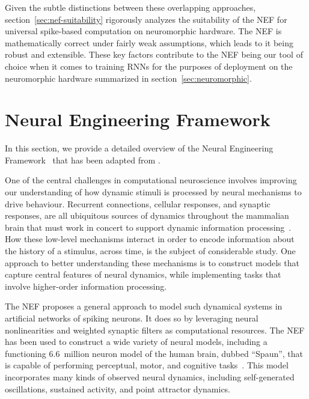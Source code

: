Given the subtle distinctions between these overlapping approaches,
section~\ref{sec:nef-suitability} rigorously analyzes the suitability of the NEF for universal spike-based computation on neuromorphic hardware.
The NEF is mathematically correct under fairly weak assumptions, which leads to it being robust and extensible.
These key factors contribute to the NEF being our tool of choice when it comes to training RNNs for the purposes of deployment on the neuromorphic hardware summarized in section~\ref{sec:neuromorphic}.

\section{Neural Engineering Framework}
\label{sec:nef}

In this section, we provide a detailed overview of the Neural Engineering Framework~\citep[NEF;][]{eliasmith2003a} that has been adapted from \citet{voelker2018}.

One of the central challenges in computational neuroscience involves improving our understanding of how dynamic stimuli is processed by neural mechanisms to drive behaviour.
Recurrent connections, cellular responses, and synaptic responses, are all ubiquitous sources of dynamics throughout the mammalian brain that must work in concert to support dynamic information processing~\citep{kandel2000principles}.
How these low-level mechanisms interact in order to encode information about the history of a stimulus, across time, is the subject of considerable study.
One approach to better understanding these mechanisms is to construct models that capture central features of neural dynamics, while implementing tasks that involve higher-order information processing.


The NEF proposes a general approach to model such dynamical systems in artificial networks of spiking neurons.
It does so by leveraging neural nonlinearities and weighted synaptic filters as computational resources.
The NEF has been used to construct a wide variety of neural models, including a functioning 6.6~million neuron model of the human brain, dubbed ``Spaun'', that is capable of performing perceptual, motor, and cognitive tasks~\citep{eliasmith2012, choo2018}.
This model incorporates many kinds of observed neural dynamics, including self-generated oscillations, sustained activity, and point attractor dynamics.

